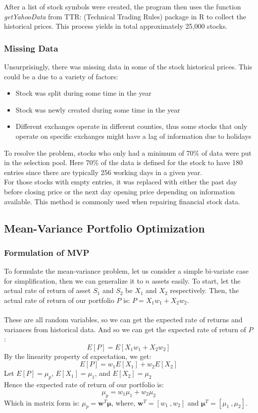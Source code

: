 \documentclass[12pt,titlepage,a4paper]{article}
\begin{document}
			After a list of stock symbols were created, the program then uses the function \textit{getYahooData} from TTR: (Technical Trading Rules) package in R to collect the historical prices. This process yields in total approximately 25,000 stocks. 
		
		\subsubsection{Missing Data}
			Unsurprisingly, there was missing data in some of the stock historical prices. This could be a due to a variety of factors: 
			\begin{itemize}
				\item Stock was split during some time in the year
				\item Stock was newly created during some time in the year
				\item Different exchanges operate in different counties, thus some stocks that only operate on specific exchanges might have a lag of information due to holidays
			\end{itemize}

			To resolve the problem, stocks who only had a minimum of 70\% of data were put in the selection pool. Here 70\% of the data is defined for the stock to have 180 entries since there are typically 256 working days in a given year.\\

			For those stocks with empty entries, it was replaced with either the past day before closing price or the next day opening price depending on information available. This method is commonly used when repairing financial stock data.  

	\subsection{Mean-Variance Portfolio Optimization}
		\subsubsection{Formulation of MVP}
			To formulate the mean-variance problem, let us consider a simple bi-variate case for simplification, then we can generalize it to $n$ assets easily. To start, let the actual rate of return of asset $S_1$ and $S_2$ be $X_1$ and $X_2$ respectively. Then, the actual rate of return of our portfolio $P$ is: $P = X_1w_1 + X_2w_2$.\\
			\\
			These are all random variables, so we can get the expected rate of returns and variances from historical data. And so we can get the expected rate of return of $P$: 
			$$
				E[P] = E[X_1w_1 + X_2w_2]
			$$
			By the linearity property of expectation, we get: 
			$$
				E[P] = w_1E[X_1] + w_2E[X_2]
			$$
			Let $E[P] = \mu_p$, $E[X_1] = \mu_1$, and $E[X_2]=\mu_2$ \\
			Hence the expected rate of return of our portfolio is: 
			$$
				\mu_p = w_1 \mu_1 + w_2 \mu_2
			$$
			Which in matrix form is: $\mu_p = \mathbf{w}^T\pmb{\mu}$, where,  $\mathbf{w}^T = [ w_1\ ,  w_2 ]$ and  $\pmb{\mu}^T = [ \mu_1\ , \mu_2 ]$. \\
\end{document}
